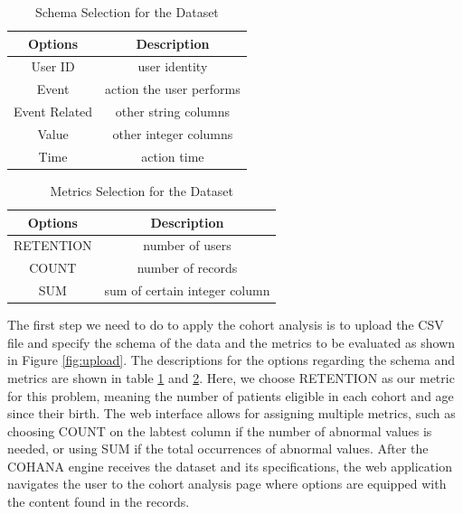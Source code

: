\documentclass[10pt,conference,letterpaper]{IEEEtran}
\begin{document}
\begin{table}[h!]
\begin{center}
    \begin{tabular}{ |c|c| }
        \hline
        Options & Description \\[0.5ex] 
        \hline\hline
        User ID & user identity \\
        \hline
        Event & action the user performs\\
        \hline
        Event Related & other string columns\\
        \hline
        Value & other integer columns\\
        \hline
        Time & action time \\
        \hline
    \end{tabular}
\end{center}
\caption{Schema Selection for the Dataset}
\label{table:schema}
\end{table}

\begin{table}[h!]
\begin{center}
    \begin{tabular}{ | c | c | }
        \hline
        Options & Description \\[0.5ex] 
        \hline\hline
        RETENTION & number of users \\
        \hline
        COUNT & number of records \\
        \hline
        SUM & sum of certain integer column \\
        \hline
    \end{tabular}
\end{center}
\caption{Metrics Selection for the Dataset}
\label{table:metrics}
\end{table}

The first step we need to do to apply the cohort analysis is to upload the CSV file and specify the schema of the data and the metrics to be evaluated as shown in Figure \ref{fig:upload}. 
The descriptions for the options regarding the schema and metrics are shown in table \ref{table:schema} and \ref{table:metrics}. 
Here, we choose RETENTION as our metric for this problem, meaning the number of patients eligible in each cohort and age since their birth. 
The web interface allows for assigning multiple metrics, such as choosing COUNT on the labtest column if the number of abnormal values is needed, or using SUM if the total occurrences of abnormal values. 
After the COHANA engine receives the dataset and its specifications, the web application navigates the user to the cohort analysis page where options are equipped with the content found in the records.
\end{document}

